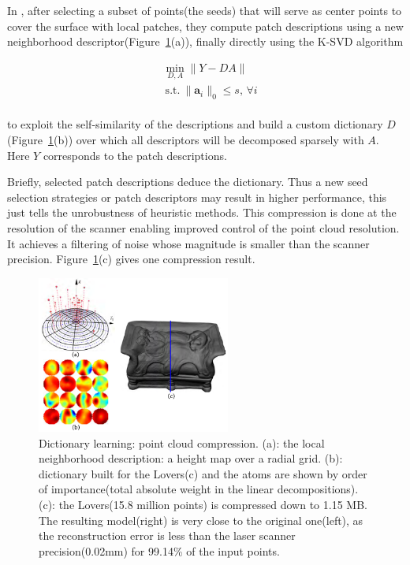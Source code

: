In \cite{digne2014self}, after selecting a subset of points(the seeds) that will serve as center points to cover the surface with local patches,
they compute patch descriptions using a new neighborhood descriptor(Figure~\ref{fig:compressionlearning}(a)),
finally directly using the K-SVD algorithm \cite{aharon2006svd}

\small{
\begin{equation}
\label{eq:dictcompression}
\begin{split}
&\min_{D,A}  \|Y-DA\| \\
&~\mathrm{s.t.}~ \|\mathbf{a}_i\|_0 \leq s,\,\forall i
\end{split}
\end{equation}
}
\\
to exploit the self-similarity of the descriptions and build a custom dictionary $D$(Figure~\ref{fig:compressionlearning}(b)) over which all descriptors will be decomposed sparsely with $A$.
Here $Y$ corresponds to the patch descriptions.

Briefly, selected patch descriptions deduce the dictionary.
Thus a new seed selection strategies or patch descriptors may result in higher performance,
this just tells the unrobustness of heuristic methods.
This compression is done at the resolution of the scanner enabling improved control of the point cloud resolution.
It achieves a filtering of noise whose magnitude is smaller than the scanner precision.
Figure~\ref{fig:compressionlearning}(c) gives one compression result.

\begin{figure}[ht]
  \centering
  \includegraphics[width=2.5in]{images/compression_learning}
  \caption{Dictionary learning: point cloud compression\cite{digne2014self}. (a): the local neighborhood description: a height map over a radial grid. (b): dictionary built for the Lovers(c) and the atoms are shown by order of importance(total absolute weight in the linear decompositions). (c): the Lovers(15.8 million points) is compressed down to 1.15 MB. The resulting model(right) is very close to the original one(left), as the reconstruction error is less than the laser scanner precision(0.02mm) for 99.14\% of the input points.}
  \label{fig:compressionlearning}
\end{figure}


